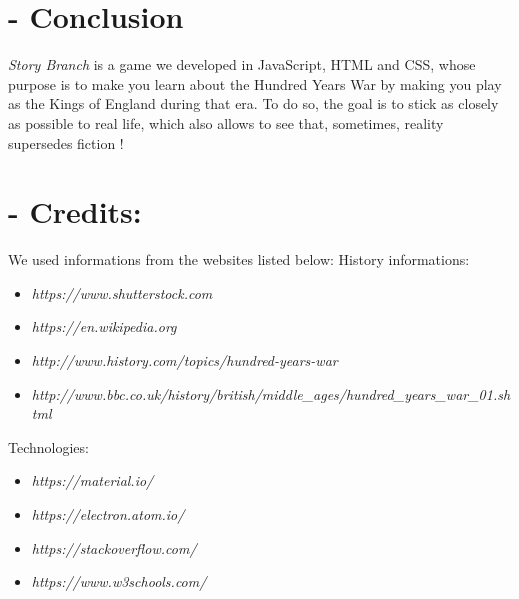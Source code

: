 \documentclass{scrreprt}
\begin{document}
{\let\clearpage\relax \chapter{- Conclusion}}
\textit{Story Branch} is a game we developed in JavaScript, HTML and CSS, whose purpose is to make you learn about the Hundred Years War by making you play as the Kings of England during that era. To do so, the goal is to stick as closely as possible to real life, which also allows to see that, sometimes, reality supersedes fiction !


{\let\clearpage\relax \chapter{- Credits:}}

We used informations from the websites listed below: \newline
History informations:
\begin{itemize}
\item \textit{https://www.shutterstock.com}
\item \textit{https://en.wikipedia.org}
\item \textit{http://www.history.com/topics/hundred-years-war}
\item \textit{http://www.bbc.co.uk/history/british/middle_ages/hundred_years_war_01.shtml}
\end{itemize}

Technologies:
\begin{itemize}
\item \textit{https://material.io/}
\item \textit{https://electron.atom.io/}
\item \textit{https://stackoverflow.com/}
\item \textit{https://www.w3schools.com/}
\end{itemize}
\end{document}
